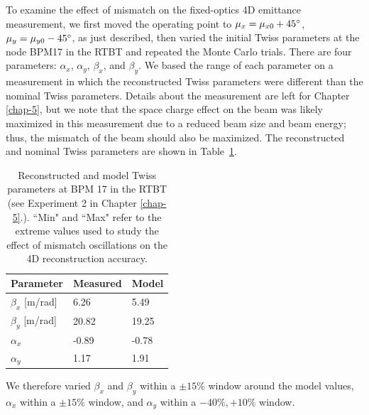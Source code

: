 To examine the effect of mismatch on the fixed-optics 4D emittance measurement, we first moved the operating point to $\mu_x = \mu_{x0} + 45\degree$, $\mu_y = \mu_{y0} - 45\degree$, as just described, then varied the initial Twiss parameters at the node BPM17 in the RTBT and repeated the Monte Carlo trials. There are four parameters: $\alpha_x$, $\alpha_y$, $\beta_x$, and $\beta_y$. We based the range of each parameter on a measurement in which the reconstructed Twiss parameters were different than the nominal Twiss parameters. Details about the measurement are left for Chapter \ref{chap-5}, but we note that the space charge effect on the beam was likely maximized in this measurement due to a reduced beam size and beam energy; thus, the mismatch of the beam should also be maximized. The reconstructed and nominal Twiss parameters are shown in Table~\ref{tab:mismatch}.
%
\begin{table}[!p]
    \centering
    \caption{Reconstructed and model Twiss parameters at BPM 17 in the RTBT (see Experiment 2 in Chapter \ref{chap-5}.). ``Min" and ``Max" refer to the extreme values used to study the effect of mismatch oscillations on the 4D reconstruction accuracy.}
    \begin{tabular}{lll}
    \midrule
    \textbf{Parameter} & \textbf{Measured} & \textbf{Model} \\
    \midrule
    $\beta_x$ [m/rad] & 6.26 & 5.49 \\
    $\beta_y$ [m/rad] & 20.82 & 19.25 \\
    $\alpha_x$ & -0.89 & -0.78 \\
    $\alpha_y$ & 1.17 & 1.91 \\
    \midrule    
    \end{tabular}
    \label{tab:mismatch}
\end{table}
%
We therefore varied $\beta_x$ and $\beta_y$ within a $\pm 15\%$ window around the model values, $\alpha_x$ within a $\pm 15\%$ window, and $\alpha_y$ within a $-40\%, +10\%$ window.

